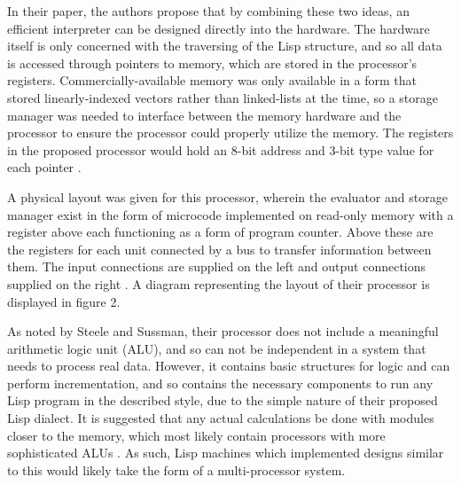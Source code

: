 \documentclass[journal]{IEEEtran}
\begin{document}
In their paper, the authors propose that by combining these two ideas, an efficient interpreter can be designed directly into the hardware. The hardware itself is only concerned with the traversing of the Lisp structure, and so all data is accessed through pointers to memory, which are stored in the processor's registers. Commercially-available memory was only available in a form that stored linearly-indexed vectors rather than linked-lists at the time, so a storage manager was needed to interface between the memory hardware and the processor to ensure the processor could properly utilize the memory. The registers in the proposed processor would hold an 8-bit address and 3-bit type value for each pointer \cite{ss}.

A physical layout was given for this processor, wherein the evaluator and storage manager exist in the form of microcode implemented on read-only memory with a register above each functioning as a form of program counter. Above these are the registers for each unit connected by a bus to transfer information between them. The input connections are supplied on the left and output connections supplied on the right \cite{ss}. A diagram representing the layout of their processor is displayed in figure 2.

As noted by Steele and Sussman, their processor does not include a meaningful arithmetic logic unit (ALU), and so can not be independent in a system that needs to process real data. However, it contains basic structures for logic and can perform incrementation, and so contains the necessary components to run any Lisp program in the described style, due to the simple nature of their proposed Lisp dialect. It is suggested that any actual calculations be done with modules closer to the memory, which most likely contain processors with more sophisticated ALUs \cite{ss}. As such, Lisp machines which implemented designs similar to this would likely take the form of a multi-processor system.

%
%
\end{document}
